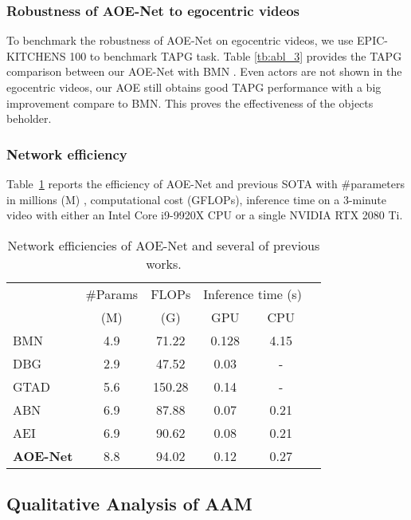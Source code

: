 \documentclass[sn-mathphys]{sn-jnl}
\theoremstyle{thmstyleone}\newtheorem{theorem}{Theorem}\newtheorem{proposition}[theorem]{Proposition}
\theoremstyle{thmstyletwo}\newtheorem{example}{Example}\newtheorem{remark}{Remark}
\theoremstyle{thmstylethree}\newtheorem{definition}{Definition}
\begin{document}
\subsubsection{Robustness of AOE-Net to egocentric videos}
To benchmark the robustness of AOE-Net on egocentric videos, we use EPIC-KITCHENS 100 \cite{damen2021rescaling} to benchmark TAPG task. Table \ref{tb:abl_3} provides the TAPG comparison between our AOE-Net with BMN \cite{bmn}. Even actors are not shown in the egocentric videos, our AOE still obtains good TAPG performance with a big improvement compare to BMN. This proves the effectiveness of the objects beholder.


\subsubsection{Network efficiency}
Table~\ref{tb:abl_4} reports the efficiency of AOE-Net and previous SOTA with \#parameters in millions (M) , computational cost (GFLOPs), inference time on a 3-minute video with either an Intel Core i9-9920X CPU or a single NVIDIA RTX 2080 Ti.

\begin{table}[!t]
\centering
\begin{tabular}{l|ccccc}
      & \#Params& FLOPs & \multicolumn{2}{c}{Inference time (s)} \\ 
      & (M) & (G) & GPU & CPU\\ 
      \hline \hline
BMN~\cite{bmn} & 4.9 & 71.22 & 0.128 & 4.15 \\ DBG~\cite{dbg} & 2.9 & 47.52 & 0.03 & - \\ GTAD~\cite{xu2020gtad} & 5.6 & 150.28 & 0.14 & - \\ ABN~\cite{KhoaVo_Access} & 6.9 & 87.88 & 0.07 & 0.21\\ AEI~\cite{khoavo_aei_bmvc21} & 6.9 & 90.62 & 0.08 & 0.21 \\ \hline
      \textbf{AOE-Net} & 8.8 & 94.02 & 0.12 & 0.27 \\ \bottomrule
\end{tabular}
\caption{Network efficiencies of AOE-Net and several of previous works.} \label{tb:abl_4}
\end{table}



\subsection{Qualitative Analysis of AAM}
\end{document}
